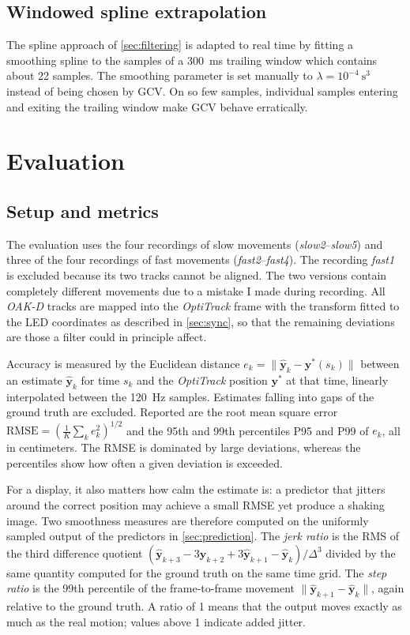 \documentclass{siamart251216}
\begin{document}
\subsection{Windowed spline extrapolation}

The spline approach of \cref{sec:filtering} is adapted to real time by fitting a smoothing spline to the samples of a 300~ms trailing window which contains about 22 samples.
The smoothing parameter is set manually to $\lambda = 10^{-4}~\text{s}^3$ instead of being chosen by GCV\@.
On so few samples, individual samples entering and exiting the trailing window make GCV behave erratically.

\section{Evaluation}
\label{sec:evaluation}

\subsection{Setup and metrics}

The evaluation uses the four recordings of slow movements (\emph{slow2}--\emph{slow5}) and three of the four recordings of fast movements (\emph{fast2}--\emph{fast4}).
The recording \emph{fast1} is excluded because its two tracks cannot be aligned.
The two versions contain completely different movements due to a mistake I made during recording.
All \emph{OAK-D} tracks are mapped into the \emph{OptiTrack} frame with the transform fitted to the LED coordinates as described in \cref{sec:sync}, so that the remaining deviations are those a filter could in principle affect.

Accuracy is measured by the Euclidean distance $e_k = \lVert \hat{\mathbf{y}}_k - \mathbf{y}^*(s_k) \rVert$ between an estimate $\hat{\mathbf{y}}_k$ for time $s_k$ and the \emph{OptiTrack} position $\mathbf{y}^*$ at that time, linearly interpolated between the 120~Hz samples.
Estimates falling into gaps of the ground truth are excluded.
Reported are the root mean square error $\mathrm{RMSE} = (\frac{1}{K} \sum_k e_k^2)^{1/2}$ and the 95th and 99th percentiles P95 and P99 of $e_k$, all in centimeters.
The RMSE is dominated by large deviations, whereas the percentiles show how often a given deviation is exceeded.

For a display, it also matters how calm the estimate is: a predictor that jitters around the correct position may achieve a small RMSE yet produce a shaking image.
Two smoothness measures are therefore computed on the uniformly sampled output of the predictors in \cref{sec:prediction}.
The \emph{jerk ratio} is the RMS of the third difference quotient $(\hat{\mathbf{y}}_{k+3} - 3 \hat{\mathbf{y}}_{k+2} + 3 \hat{\mathbf{y}}_{k+1} - \hat{\mathbf{y}}_k) / \Delta^3$ divided by the same quantity computed for the ground truth on the same time grid.
The \emph{step ratio} is the 99th percentile of the frame-to-frame movement $\lVert \hat{\mathbf{y}}_{k+1} - \hat{\mathbf{y}}_k \rVert$, again relative to the ground truth.
A ratio of 1 means that the output moves exactly as much as the real motion; values above 1 indicate added jitter.
\end{document}
